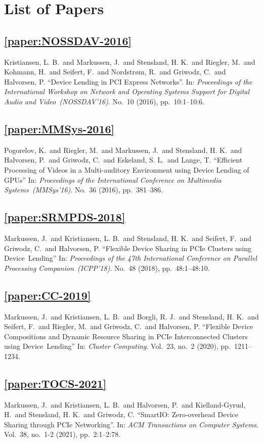 \chapter{List of Papers}
\section*{\cref{paper:NOSSDAV-2016}}
Kristiansen, L. B.\ and Markussen, J.\ and Stensland, H. K.\ and Riegler, M.\ and Kohmann, H.\ and Seifert, F.\ and Nordstr{\o}m, R.\ and Griwodz, C.\ and Halvorsen, P.
\enquote{Device Lending in PCI Express Networks}.
In: \emph{Proceedings of the International Workshop on Network and Operating Systems Support for Digital Audio and Video~(NOSSDAV'16)}.
No.~10 (2016),
pp.~10:1--10:6.


\section*{\cref{paper:MMSys-2016}}
Pogorelov, K.\ and Riegler, M.\ and Markussen, J.\ and Stensland, H. K.\ and Halvorsen, P.\ and Griwodz, C.\ and Eskeland, S. L.\ and Lange, T.
\enquote{Efficient Processing of Videos in a Multi-auditory Environment using Device Lending of GPUs}
In: \emph{Proceedings of the International Conference on Multimedia Systems~(MMSys'16)}.
No.~36 (2016),
pp.~381--386.


\section*{\cref{paper:SRMPDS-2018}}
Markussen, J.\ and Kristiansen, L. B.\ and Stensland, H. K.\ and Seifert, F.\ and Griwodz, C.\ and Halvorsen, P.
\enquote{Flexible Device Sharing in PCIe Clusters using Device~Lending}
In: \emph{Proceedings of the 47th International Conference on Parallel Processing Companion~(ICPP'18)}.
No.~48 (2018),
pp.~48:1--48:10.


\section*{\cref{paper:CC-2019}}
Markussen, J.\ and Kristiansen, L. B.\ and Borgli, R. J.\ and Stensland, H. K.\ and Seifert, F.\ and Riegler, M.\ and Griwodz, C.\ and Halvorsen, P.
\enquote{Flexible Device Compositions and Dynamic Resource Sharing in PCIe Interconnected Clusters using Device~Lending}
In: \emph{Cluster Computing}.
Vol.~23,
no.~2
(2020),
pp.~1211--1234.


\section*{\cref{paper:TOCS-2021}}
Markussen, J.\ and Kristiansen, L. B.\ and Halvorsen, P.\ and Kielland-Gyrud, H.\ and Stensland, H. K.\ and Griwodz, C.
\enquote{SmartIO: Zero-overhead Device Sharing through PCIe Networking}.
In: \emph{ACM Transactions on Computer Systems}.
Vol.~38,
no.~1-2
(2021),
pp.~2:1--2:78.

